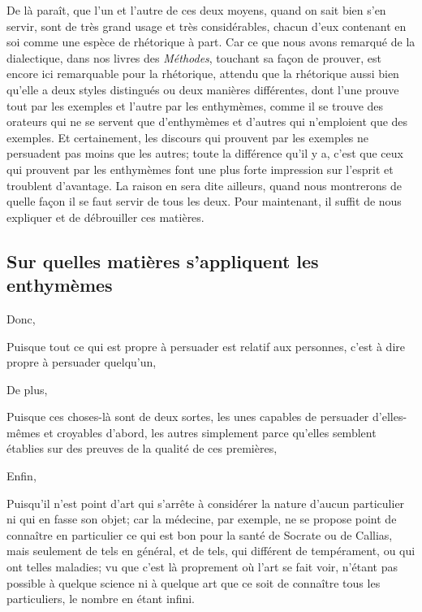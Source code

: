 De là paraît, que l'un et l'autre de ces deux moyens, quand on sait bien s'en servir, sont de très grand usage et très considérables, chacun d'eux contenant
en soi comme une espèce de rhétorique à part. Car ce que nous avons remarqué de la dialectique, dans nos livres des \emph{Méthodes}, touchant sa façon de prouver,
est encore ici remarquable pour la rhétorique, attendu que la rhétorique aussi bien qu'elle a deux styles distingués ou deux manières différentes, dont l'une prouve
tout par les exemples et l'autre par les enthymèmes, comme il se trouve des orateurs qui ne se servent que d'enthymèmes et d'autres qui n'emploient que des exemples.
Et certainement, les discours qui prouvent par les exemples ne persuadent pas moins que les autres; toute la différence qu'il y a, c'est que ceux qui prouvent par
les enthymèmes font une plus forte impression sur l'esprit et troublent d'avantage. La raison en sera dite ailleurs, quand nous montrerons de quelle façon il se faut
servir de tous les deux. Pour maintenant, il suffit de nous expliquer et de débrouiller ces matières.

\subsection{Sur quelles matières s'appliquent les enthymèmes}

Donc,

\begin{emphpar}
	Puisque tout ce qui est propre à persuader est relatif aux personnes, c'est à dire propre à persuader quelqu'un,
\end{emphpar}

De plus,

\begin{emphpar}
	Puisque ces choses-là sont de deux sortes, les unes capables de persuader d'elles-mêmes et croyables d'abord, les
	autres simplement parce qu'elles semblent établies sur des preuves de la qualité de ces premières,
\end{emphpar}

Enfin,

\begin{emphpar}
	Puisqu'il n'est point d'art qui s'arrête à considérer la nature d'aucun particulier ni qui en fasse son objet; car
	la médecine, par exemple, ne se propose point de connaître en particulier ce qui est bon pour la santé de Socrate ou
	de Callias, mais seulement de tels en général, et de tels, qui différent de tempérament, ou qui ont telles maladies;
	vu que c'est là proprement où l'art se fait voir, n'étant pas possible à quelque science ni à quelque art que ce soit
	de connaître tous les particuliers, le nombre en étant infini.
\end{emphpar}

